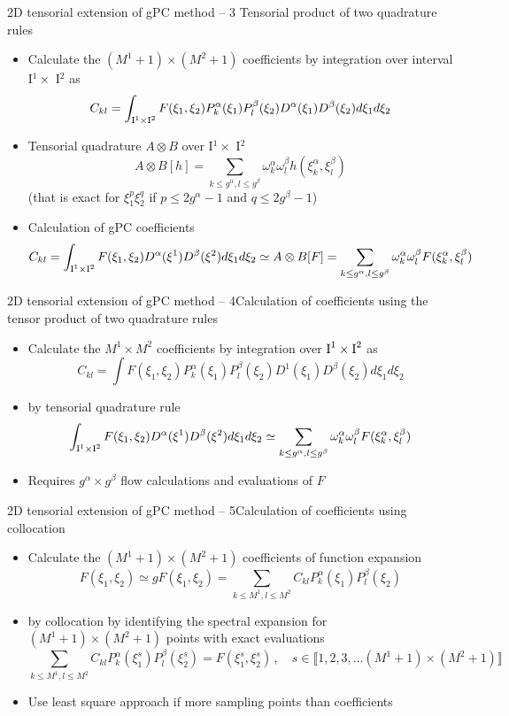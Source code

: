 \documentclass[10pt]{beamer}
\def\vr{\vspace{3mm}}
\def\vv{\vspace{5mm}}
\def\begit{\begin{itemize}}
\def\endit{\end{itemize}}
\def\Ir{{\textrm I}}
\begin{document}
\begin{frame}{2D tensorial extension of gPC method -- 3}{ Tensorial product of two quadrature rules}
%
\footnotesize{
%
\begit
%
\item Calculate the $  (M^1+1)\times (M^2+1)$ coefficients by integration over interval \Ir$^1 \times$ \Ir$^2$ as 
%
    $$ C_{kl} = \int_{\Ir^1\times \Ir^2}  F(\xi_1, \xi_2)  P^\alpha_k (\xi_1)  P^\beta_l (\xi_2) D^\alpha(\xi_1)D^\beta(\xi_2) d\xi_1 d\xi_2 $$
%
\vr
\item Tensorial quadrature  $A \otimes B$ over \Ir$^1 \times$ \Ir$^2$
        $$ A \otimes B[h] = \sum_{k\leq g^\alpha, l \leq g^\beta} \omega^\alpha_k \omega^\beta_l h(\xi^\alpha_k, \xi^\beta_l) $$
 (that is exact for $ \xi_ 1^p \xi_2^q$ if $ p \leq 2 g^\alpha-1 $ and $q \leq 2g^\beta-1 $) 
%
\vv
\item Calculation of gPC coefficients
%
   $$ C_{kl} = \int_{\Ir^1\times \Ir^2 } F(\xi_1, \xi_2) D^\alpha (\xi^1) D^\beta(\xi^2) d\xi_1 d\xi_2 \simeq  A \otimes B[F]
    =  \sum_{k\leq g^\alpha, l \leq g^\beta} \omega^\alpha_k \omega^\beta_l F(\xi^\alpha_k, \xi^\beta_l)  $$
%

\endit
%
}
%
\end{frame}
%
%
\begin{frame}{2D tensorial extension of gPC method -- 4}{Calculation of coefficients using the tensor product of two quadrature rules}
%
\footnotesize{
%
\begit
%
\item Calculate the $  M^1\times M^2$ coefficients by integration over $\Ir^1 \times \Ir^2$ as 
%
    $$ C_{kl} = \int  F(\xi_1,\xi_2)  P^\alpha_k (\xi_1)  P^\beta_l (\xi_2) D^1(\xi_1) D^\beta(\xi_2) d\xi_1 d\xi_2 $$
%
\item[] by tensorial quadrature rule 
% 
   $$ \int_{\Ir^1\times \Ir^2 } F(\xi_1, \xi_2) D^\alpha (\xi^1) D^\beta(\xi^2) d\xi_1 d\xi_2 \simeq   \sum_{k\leq g^\alpha, l \leq g^\beta} \omega^\alpha_k \omega^\beta_l F(\xi^\alpha_k, \xi^\beta_l)   $$
%
\vv
\item Requires $g^\alpha \times g^\beta$ flow calculations and evaluations of $F$
\endit
%
}
%
\end{frame}
%
%
\begin{frame}{2D tensorial extension of gPC method -- 5}{Calculation of coefficients using collocation}
%
\footnotesize{
%
\begit
%
\item Calculate the $(M^1+1)\times (M^2+1)$ coefficients of function expansion  
%
     $$ F(\xi_1,\xi_2) \simeq gF(\xi_1,\xi_2) = \sum_{k\leq M^1,l \leq M^2} C_{kl} P^\alpha_k (\xi_1)  P^\beta_l (\xi_2)$$
%
\item[]  by collocation by identifying the spectral expansion for 
 $(M^1+1) \times (M^2+1) $ points with exact evaluations
% 
     $$ \sum_{k\leq M^1,l \leq M^2} C_{kl} P^\alpha_k (\xi_1^s)  P^\beta_l (\xi_2^s) = F(\xi_1^s, \xi_2^s)\,,\quad s \in \llbracket 1,2,3,\dots(M^1+1) \times (M^2+1)\rrbracket$$
%
\item Use least square approach if more sampling points than coefficients
%   
\endit
%
}
%
\end{frame}
\end{document}
